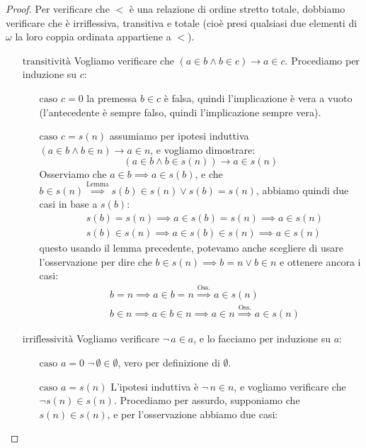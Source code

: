 \documentclass[11pt]{scrartcl}
\begin{document}
\begin{proof}
	Per verificare che $<$ è una relazione di ordine stretto totale, dobbiamo verificare che è irriflessiva, transitiva e totale (cioè presi qualsiasi due elementi di $\omega$ la loro coppia ordinata appartiene a $<$).
	\begin{itemize}
		\item[$\boxed{\text{transitività}}$] Vogliamo verificare che $(a \in b \land b \in c) \rightarrow a \in c$. Procediamo per induzione su $c$:
		\begin{itemize}
			\item[$\boxed{\text{caso $c = 0$}}$] la premessa $b \in c$ è falsa, quindi l'implicazione è vera a vuoto (l'antecedente è sempre falso, quindi l'implicazione sempre vera).
			\item[$\boxed{\text{caso $c = s(n)$}}$] assumiamo per ipotesi induttiva $(a \in b \land b \in n) \rightarrow a \in n$, e vogliamo dimostrare:
				\[ (a \in b \land b \in s(n)) \rightarrow a \in s(n)
					\]
				Osserviamo che $a \in b \implies a \in s(b)$, e che $b \in s(n) \overset{\text{Lemma}}{\implies} s(b) \in s(n) \lor s(b) = s(n)$, abbiamo quindi due casi in base a $s(b)$:
				\[ \begin{split}
					& s(b) = s(n) \implies a \in s(b) = s(n) \implies a \in s(n)\\
					& s(b) \in s(n) \implies a \in s(b) \in s(n) \implies a \in s(n)
				\end{split}
					\]
				questo usando il lemma precedente, potevamo anche scegliere di usare l'osservazione per dire che $b \in s(n) \implies b = n \lor b \in n$ e ottenere ancora i casi:
				\[  \begin{split}
					& b = n \implies a \in b = n \overset{\text{Oss.}}{\implies} a \in s(n) \\
					& b \in n \implies a \in b \in n \implies a \in n \overset{\text{Oss.}}{\implies} a \in s(n)
					\end{split}
					\]
		\end{itemize}
		\item[$\boxed{\text{irriflessività}}$] Vogliamo verificare $\neg \,a \in a$, e lo facciamo per induzione su $a$:
		\begin{itemize}
			\item[$\boxed{\text{caso $a = 0$}}$] $\neg \, \emptyset \in \emptyset$, vero per definizione di $\emptyset$.
			\item[$\boxed{\text{caso $a = s(n)$}}$] L'ipotesi induttiva è $\neg \, n \in n$, e vogliamo verificare che $\neg s(n) \in s(n)$. Procediamo per assurdo, supponiamo che $s(n) \in s(n)$, e per l'osservazione abbiamo due casi:

\end{itemize}
\end{itemize}
\end{proof}
\end{document}
